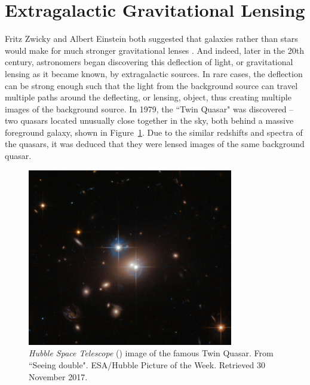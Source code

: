 
\section{Extragalactic Gravitational Lensing}

Fritz Zwicky and Albert Einstein both suggested that galaxies rather than stars would make for much stronger gravitational lenses \citep{Zwicky:1937yq,Einstein:1936cl}. And indeed, later in the 20th century, astronomers began discovering this deflection of light, or gravitational lensing as it became known, by extragalactic sources. In rare cases, the deflection can be strong enough such that the light from the background source can travel multiple paths around the deflecting, or lensing, object, thus creating multiple images of the background source. In 1979, the ``Twin Quasar" was discovered -- two quasars located unusually close together in the sky, both behind a massive foreground galaxy, shown in Figure~\ref{intro:fig:quasar}. Due to the similar redshifts and spectra of the quasars, it was deduced that they were lensed images of the same background quasar.

\begin{figure}
\centering
\includegraphics[width=0.8\textwidth]{Intro/twin_quasar.png}
\caption[\hst\ image of the Twin Quasar]{{\it Hubble Space Telescope} (\hst) image of the famous Twin Quasar. From  ``Seeing double". ESA/Hubble Picture of the Week. Retrieved 30 November 2017.}
\label{intro:fig:quasar}
\end{figure}

